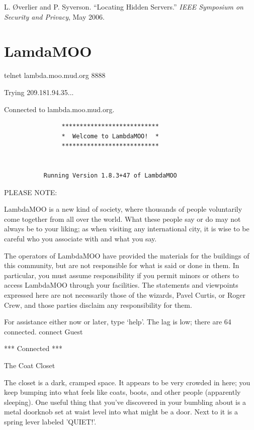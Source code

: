 \documentclass[10pt,twoside,openright]{memoir}
\begin{document}
\vskip 0.2in 

\noindent L. {\O}verlier and P. Syverson. ``Locating Hidden Servers.'' \textit{IEEE Symposium on Security and Privacy}, May 2006.


\chapter{LamdaMOO}

{\footnotesize
\ttfamily
\parindent0pt
\parskip6pt
telnet lambda.moo.mud.org 8888

Trying 209.181.94.35...

Connected to lambda.moo.mud.org.

\begin{verbatim}
                ***************************
                *  Welcome to LambdaMOO!  *
                ***************************


           Running Version 1.8.3+47 of LambdaMOO
\end{verbatim}

PLEASE NOTE:

LambdaMOO is a new kind of society, where thousands of people voluntarily
come together from all over the world.  What these people say or do may not
always be to your liking; as when visiting any international city, it is wise
to be careful who you associate with and what you say.

The operators of LambdaMOO have provided the materials for the buildings of
this community, but are not responsible for what is said or done in them.  In
particular, you must assume responsibility if you permit minors or others to
access LambdaMOO through your facilities.  The statements and viewpoints
expressed here are not necessarily those of the wizards, Pavel Curtis,
or Roger Crew, and those parties disclaim any responsibility for them.

For assistance either now or later, type `help'.
The lag is low; there are 64 connected.
connect Guest

*** Connected ***

The Coat Closet

The closet is a dark, cramped space.  It appears  to be very crowded in here; you keep bumping into what feels like coats,  boots, and other people (apparently sleeping).  One useful thing that you've  discovered in your bumbling about is a metal doorknob set at waist level into  what might be a door.  Next to it is a spring lever labeled 'QUIET!'.

}
\end{document}
